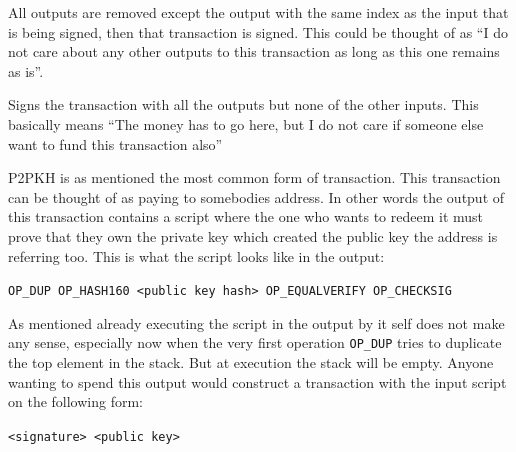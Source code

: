 All outputs are removed except the output with the same index as the input that is being signed, then that transaction is signed.
This could be thought of as \enquote{I do not care about any other outputs to this transaction as long as this one remains as is}.

Signs the transaction with all the outputs but none of the other inputs. This basically means \enquote{The money has to go here, but I do not care if someone else want to fund this transaction also}


\label{p2pkh}
P2PKH is as mentioned the most common form of transaction.\cite{antonopoulos_2017} This transaction can be thought of as paying to somebodies address. In other words the output of this transaction contains a script where the one who wants to redeem it must prove that they own the private key which created the public key the address is referring too. This is what the script looks like in the output:

\texttt{OP\_DUP OP\_HASH160 <public key hash> OP\_EQUALVERIFY OP\_CHECKSIG}

As mentioned already executing the script in the output by it self does not make any sense, especially now when the very first operation \texttt{OP\_DUP} tries to duplicate the top element in the stack. But at execution the stack will be empty. Anyone wanting to spend this output would construct a transaction with the input script on the following form:

\texttt{<signature> <public key>}

